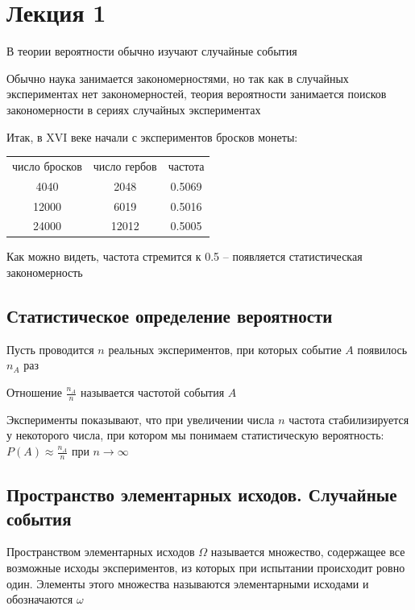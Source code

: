 \documentclass[12pt]{article}
\begin{document}
    \section{Лекция 1}

    В теории вероятности обычно изучают случайные события

    Обычно наука занимается закономерностями, но так как в случайных экспериментах нет закономерностей, теория
    вероятности занимается поисков закономерности в сериях случайных экспериментах

    Итак, в XVI веке начали с экспериментов бросков монеты:

    \begin{tabular}{ccc}
        число бросков & число гербов & частота \\
        4040 & 2048 & 0.5069 \\
        12000 & 6019 & 0.5016 \\
        24000 & 12012 & 0.5005 \\
    \end{tabular}

    Как можно видеть, частота стремится к 0.5 -- появляется статистическая закономерность

    \hypertarget{statisticaldefinitionofprobability}{}

    \subsection{Статистическое определение вероятности}

    Пусть проводится $n$ реальных экспериментов, при которых событие $A$ появилось $n_A$ раз

    Отношение $\frac{n_A}{n}$ называется частотой события $A$

    Эксперименты показывают, что при увеличении числа $n$ частота стабилизируется у некоторого числа,
    при котором мы понимаем статистическую вероятность: $P(A) \approx \frac{n_A}{n}$ при $n \to \infty$

    \subsection{Пространство элементарных исходов. Случайные события}

    \hypertarget{spaceofelementaryoutcomes}{}

    \Def Пространством элементарных исходов $\Omega$ называется множество, содержащее все возможные исходы
    экспериментов, из которых при испытании происходит ровно один. Элементы этого множества называются
    элементарными исходами и обозначаются $\omega$
\end{document}
